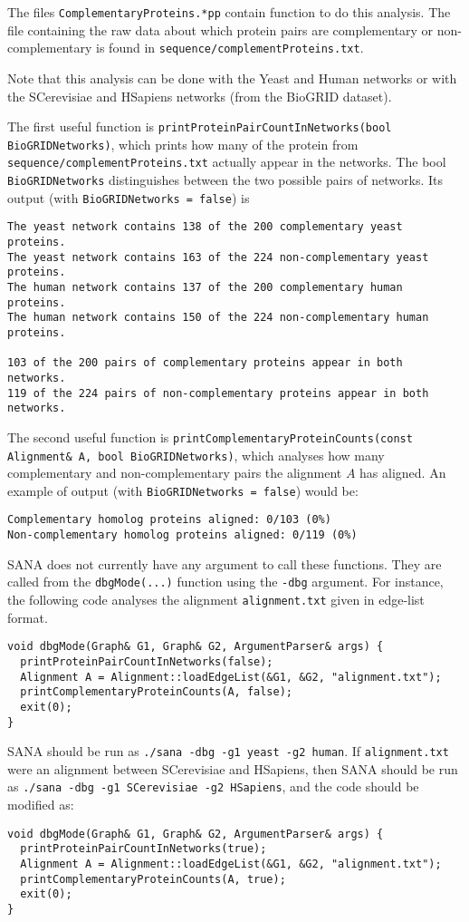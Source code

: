 \documentclass[]{article}
\begin{document}
The files \texttt{ComplementaryProteins.*pp} contain function to do this analysis. The file containing the raw data about which protein pairs are complementary or non-complementary is found in \texttt{sequence/complementProteins.txt}.

Note that this analysis can be done with the Yeast and Human networks or with the SCerevisiae and HSapiens networks (from the BioGRID dataset).

The first useful function is \texttt{printProteinPairCountInNetworks(bool BioGRIDNetworks)}, which prints how many of the protein from \texttt{sequence/complementProteins.txt} actually appear in the networks. The bool \texttt{BioGRIDNetworks} distinguishes between the two possible pairs of networks. Its output (with \texttt{BioGRIDNetworks = false}) is
\begin{verbatim}
The yeast network contains 138 of the 200 complementary yeast proteins.
The yeast network contains 163 of the 224 non-complementary yeast proteins.
The human network contains 137 of the 200 complementary human proteins.
The human network contains 150 of the 224 non-complementary human proteins.

103 of the 200 pairs of complementary proteins appear in both networks.
119 of the 224 pairs of non-complementary proteins appear in both networks.
\end{verbatim}
The second useful function is \texttt{printComplementaryProteinCounts(const Alignment\& A, bool BioGRIDNetworks)}, which analyses how many complementary and non-complementary pairs the alignment $A$ has aligned. An example of output (with \texttt{BioGRIDNetworks = false}) would be:
\begin{verbatim}
Complementary homolog proteins aligned: 0/103 (0%)
Non-complementary homolog proteins aligned: 0/119 (0%)
\end{verbatim}

SANA does not currently have any argument to call these functions. They are called from the \texttt{dbgMode(...)} function using the \texttt{-dbg} argument. For instance, the following code analyses the alignment \texttt{alignment.txt} given in edge-list format.
\begin{verbatim}
void dbgMode(Graph& G1, Graph& G2, ArgumentParser& args) {
  printProteinPairCountInNetworks(false);
  Alignment A = Alignment::loadEdgeList(&G1, &G2, "alignment.txt");
  printComplementaryProteinCounts(A, false);
  exit(0);
}
\end{verbatim}
SANA should be run as \texttt{./sana -dbg -g1 yeast -g2 human}. If \texttt{alignment.txt} were an alignment between SCerevisiae and HSapiens, then SANA should be run as \texttt{./sana -dbg -g1 SCerevisiae -g2 HSapiens}, and the code should be modified as:
\begin{verbatim}
void dbgMode(Graph& G1, Graph& G2, ArgumentParser& args) {
  printProteinPairCountInNetworks(true);
  Alignment A = Alignment::loadEdgeList(&G1, &G2, "alignment.txt");
  printComplementaryProteinCounts(A, true);
  exit(0);
}
\end{verbatim}
\end{document}
